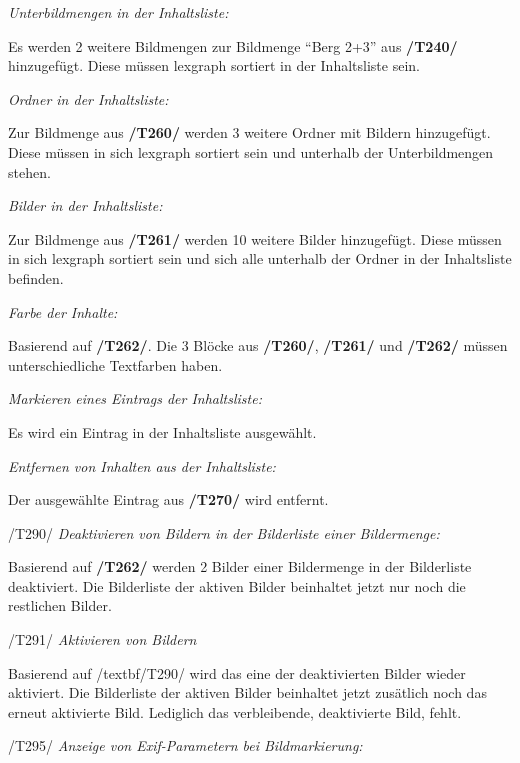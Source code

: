 \begin{description}
			\item[/T260/] \textit{Unterbildmengen in der Inhaltsliste:}\par Es werden 2 weitere Bildmengen zur Bildmenge "`Berg 2+3"' aus \textbf{/T240/} hinzugefügt. Diese müssen \gls{lexgraph} sortiert in der Inhaltsliste sein.
			\item[/T261/] \textit{Ordner in der Inhaltsliste:}\par Zur Bildmenge aus \textbf{/T260/} werden 3 weitere Ordner mit Bildern hinzugefügt. Diese müssen in sich \gls{lexgraph} sortiert sein und unterhalb der Unterbildmengen stehen.
			\item[/T262/] \textit{Bilder in der Inhaltsliste:}\par Zur Bildmenge aus \textbf{/T261/} werden 10 weitere Bilder hinzugefügt. Diese müssen in sich \gls{lexgraph} sortiert sein und sich alle unterhalb der Ordner in der Inhaltsliste befinden.
			\item[/T263/] \textit{Farbe der Inhalte:}\par Basierend auf \textbf{/T262/}. Die 3 Blöcke aus \textbf{/T260/}, \textbf{/T261/} und \textbf{/T262/} müssen unterschiedliche Textfarben haben. 
		
			\item[/T270/] \textit{Markieren eines Eintrags der Inhaltsliste:}\par Es wird ein Eintrag in der Inhaltsliste ausgewählt.
		
			\item[/T280/] \textit{Entfernen von Inhalten aus der Inhaltsliste:}\par Der ausgewählte Eintrag aus \textbf{/T270/} wird entfernt.
		
			\item{/T290/} \textit{Deaktivieren von Bildern in der Bilderliste einer Bildermenge:}\par Basierend auf \textbf{/T262/} werden 2 Bilder einer Bildermenge in der Bilderliste deaktiviert. Die Bilderliste der aktiven Bilder beinhaltet jetzt nur noch die restlichen Bilder.
			\item{/T291/} \textit{Aktivieren von Bildern}\par Basierend auf /textbf{/T290/} wird das eine der deaktivierten Bilder wieder aktiviert. Die Bilderliste der aktiven Bilder beinhaltet jetzt zusätlich noch das erneut aktivierte Bild. Lediglich das verbleibende, deaktivierte Bild, fehlt.
			
			\item{/T295/} \textit{Anzeige von Exif-Parametern bei Bildmarkierung:}\par
			
		\end{description}
	
